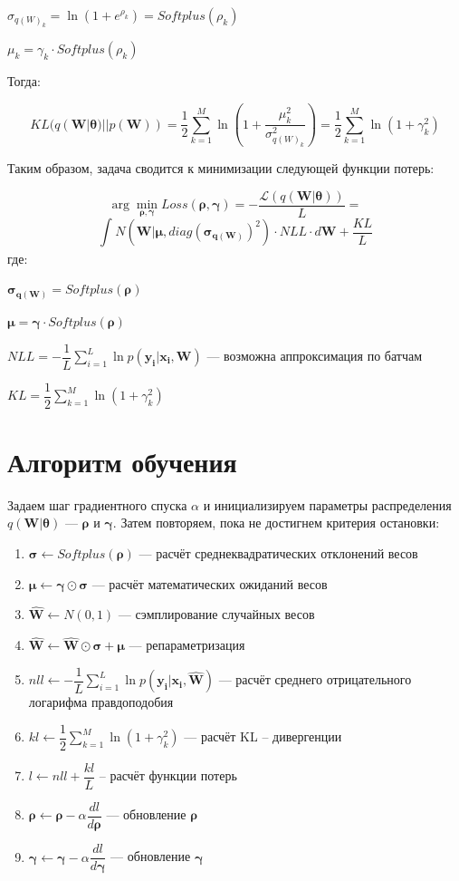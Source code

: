 \documentclass{article}
\newcommand{\argmin}{\arg\!\min}
\begin{document}
$\sigma_{{q(W)_{k}}} = \ln({1 + e^{\rho_{k}}}) = Softplus(\rho_{k})$

$\mu_{k} = \gamma_{k} \cdot Softplus(\rho_{k})$

Тогда:

\[
KL(q(\mathbf{W} | \pmb{\theta}) || p(\mathbf{W})) =
\dfrac{1}{2}\sum_{k=1}^{M}\ln({1 + \dfrac{\mu_{k}^2}{\sigma_{{q(W)_{k}}}^2}}) =
\dfrac{1}{2}\sum_{k=1}^{M}\ln({1 + \gamma_{k}^{2}})
\]

Таким образом, задача сводится к минимизации следующей функции потерь:

\[
\argmin_{\pmb{\rho}, \pmb{\gamma}} Loss(\pmb{\rho}, \pmb{\gamma}) =
- \dfrac{\mathcal{L}(q(\mathbf{W} | \pmb{\theta}))}{L} =
\]\[
\int_{}{} N(\mathbf{W} | \pmb{\mu}, diag(\pmb{\sigma_{q(\mathbf{W})}})^{2}) \cdot NLL \cdot d\mathbf{W} + \dfrac{KL}{L}
\] где:

$\pmb{\sigma_{q(\mathbf{W})}} = Softplus(\pmb{\rho})$

$\pmb{\mu} = \pmb{\gamma} \cdot Softplus(\pmb{\rho})$

$NLL = -\dfrac{1}{L}\sum_{i=1}^{L}{\ln{p( \mathbf{y_{i}} | \mathbf{x_{i}}, \mathbf{W})}}$ --- возможна аппроксимация по батчам

$KL = \dfrac{1}{2}\sum_{k=1}^{M}\ln({1 + \gamma_{k}^{2}})$

\section{Алгоритм обучения}
Задаем шаг градиентного спуска $\alpha$ и инициализируем параметры распределения $q(\mathbf{W} | \pmb{\theta})$ — $\pmb{\rho}$ и $\pmb{\gamma}$. Затем повторяем, пока не достигнем критерия остановки:
\begin{enumerate}
    \item $\pmb{\sigma} \leftarrow Softplus(\pmb{\rho})$ --- расчёт среднеквадратических отклонений весов
    \item $\pmb{\mu} \leftarrow \pmb{\gamma} \odot \pmb{\sigma}$ --- расчёт математических ожиданий весов
    \item $\hat{\mathbf{W}} \leftarrow N(0, 1)$ --- сэмплирование случайных весов
    \item $\hat{\mathbf{W}} \leftarrow \hat{\mathbf{W}} \odot \pmb{\sigma} + \pmb{\mu}$ --- репараметризация
    \item $nll \leftarrow -\dfrac{1}{L}\sum_{i=1}^{L}{\ln{p( \mathbf{y_{i}} | \mathbf{x_{i}}, \mathbf{\hat{W}})}}$ --- расчёт среднего отрицательного логарифма правдоподобия
    \item $kl \leftarrow \dfrac{1}{2}\sum_{k=1}^{M}\ln({1 + \gamma_{k}^{2}})$ --- расчёт KL -- дивергенции
    \item $l \leftarrow nll + \dfrac{kl}{L}$ -- расчёт функции потерь
    \item $\pmb{\rho} \leftarrow \pmb{\rho} - \alpha \dfrac{d l}{d \pmb{\rho}}$ --- обновление $\pmb{\rho}$
    \item $\pmb{\gamma} \leftarrow \pmb{\gamma} - \alpha \dfrac{d l}{d \pmb{\gamma}}$ --- обновление $\pmb{\gamma}$
\end{enumerate}
\end{document}
